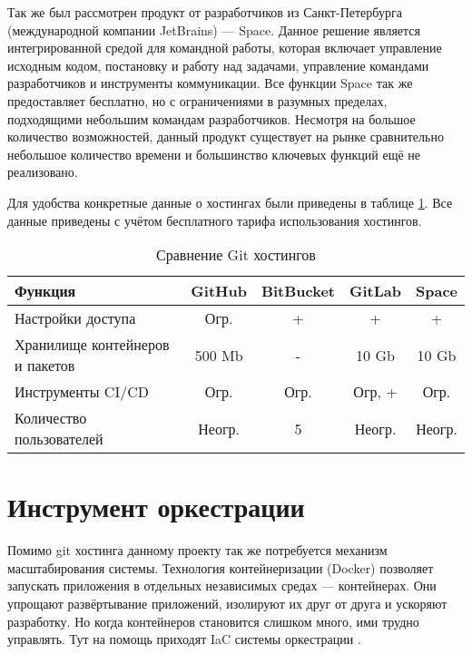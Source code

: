 Так же был рассмотрен продукт от разработчиков из Санкт-Петербурга (международной компании JetBrains) --- Space\cite{web:space:docs}.
Данное решение является интегрированной средой для командной работы, которая включает управление исходным кодом, постановку и работу над задачами, управление командами разработчиков и инструменты коммуникации.
Все функции Space так же предоставляет бесплатно, но с ограничениями в разумных пределах, подходящими небольшим командам разработчиков.
Несмотря на большое количество возможностей, данный продукт существует на рынке сравнительно небольшое количество времени и большинство ключевых функций ещё не реализовано.

Для удобства конкретные данные о хостингах были приведены в таблице \ref{tab:git-hosting}.
Все данные приведены с учётом бесплатного тарифа использования хостингов.

\begin{center}
    \begin{longtable}{|p{}|c|c|c|c|}
        \caption{Сравнение Git хостингов}
        \label{tab:git-hosting}
        \hline
        Функция                             & GitHub          & BitBucket   & GitLab    & Space \\
        \hline
        Настройки доступа                   & Огр.            & +           & +         & +     \\
        Хранилище контейнеров и пакетов     & 500 Mb          & -           & 10 Gb     & 10 Gb \\
        Инструменты CI/CD                   & Огр.            & Огр.        & Огр, +    & Огр.  \\
        Количество пользователей            & Неогр.          & 5           & Неогр.    & Неогр.\\
        \hline
    \end{longtable}
\end{center}

\section{Инструмент оркестрации}

Помимо git хостинга данному проекту так же потребуется механизм масштабирования системы.
Технология контейнеризации (Docker) позволяет запускать приложения в отдельных независимых средах --- контейнерах.
Они упрощают развёртывание приложений, изолируют их друг от друга и ускоряют разработку.
Но когда контейнеров становится слишком много, ими трудно управлять.
Тут на помощь приходят IaC системы оркестрации \cite{likeGoogle}.


